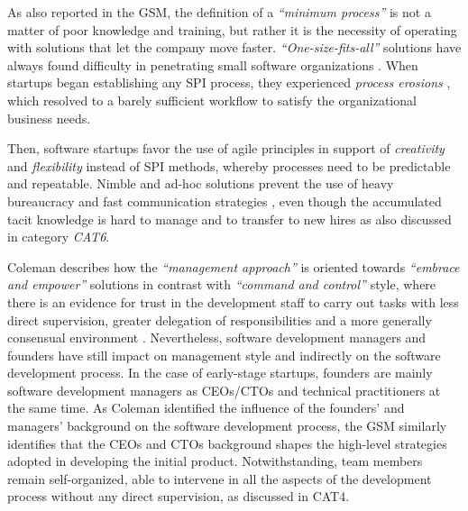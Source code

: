 \documentclass[10pt,journal,letterpaper,compsoc]{IEEEtran}
\begin{document}
As also reported in the GSM, the definition of a \textit{``minimum process''} is not a matter of poor knowledge and training, but rather it is the necessity of operating with solutions that let the company move faster. \textit{``One-size-fits-all''} solutions have always found difficulty in penetrating small software organizations \cite{Staples2007}. When startups began establishing any SPI process, they experienced \textit{process erosions}%
, which resolved to a barely sufficient workflow to satisfy the organizational business needs.

Then, software startups favor the use of agile principles in support of \textit{creativity} and \textit{flexibility} instead of SPI methods, whereby processes need to be predictable and repeatable. Nimble and ad-hoc solutions prevent the use of heavy bureaucracy and fast communication strategies%
, even though the accumulated tacit knowledge is hard to manage and to transfer to new hires as also discussed in category \textit{CAT6}.

Coleman describes how the \textit{``management approach''} is oriented towards \textit{``embrace and empower''} solutions in contrast with \textit{``command and control''} style, where there is an evidence for trust in the  development staff to carry out tasks with less direct supervision, greater delegation of responsibilities and a more generally consensual environment \cite{Coleman2008}. Nevertheless, software development managers and founders have still impact on management style and indirectly on the software development process. In the case of early-stage startups, founders are mainly software development managers as CEOs/CTOs and  technical practitioners at the same time. As Coleman identified the influence of the founders' and managers' background on the software development process, the GSM similarly identifies that the CEOs and CTOs background shapes the high-level strategies adopted in developing the initial product. Notwithstanding, team members remain self-organized, able to intervene in all the 
aspects of the development process without any direct supervision, as discussed in CAT4.
\end{document}
